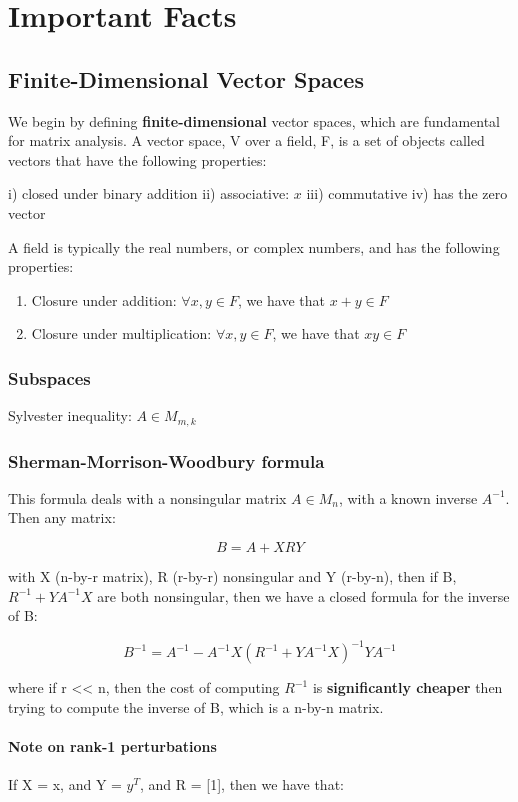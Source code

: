 \documentclass[class=article, crop=false]{standalone}
\begin{document}
\section{Important Facts}
	\subsection{Finite-Dimensional Vector Spaces}
	We begin by defining \textbf{finite-dimensional} vector spaces, which are fundamental for matrix analysis. A vector space, V over a field, F, is a set of objects called vectors that have the following properties:

	i) closed under binary addition
	ii) associative: $x$
	iii) commutative
	iv) has the zero vector

	A field is typically the real numbers, or complex numbers, and has the following properties:

	\begin{enumerate}
		\item Closure under addition: $\forall x, y \in F$, we have that $x+y \in F$
		\item Closure under multiplication: $\forall x, y \in F$, we have that $xy \in F$
	\end{enumerate}

	\subsubsection{Subspaces}

	Sylvester inequality: $A \in M_{m,k}$

	\subsubsection{Sherman-Morrison-Woodbury formula}
		This formula deals with a nonsingular matrix $A \in M_n$, with a known inverse $A^{-1}$. Then any matrix:

			$$B = A + XRY$$

		with X (n-by-r matrix), R (r-by-r) nonsingular and Y (r-by-n), then if B, $R^{-1} + YA^{-1}X$ are both nonsingular, then we have a closed formula for the inverse of B:

			$$B^{-1} = A^{-1} - A^{-1}X(R^{-1} + YA^{-1}X)^{-1} Y A^{-1}$$

		where if r << n, then the cost of computing $R^{-1}$ is \textbf{significantly cheaper} then trying to compute the inverse of B, which is a n-by-n matrix.

		\paragraph{Note on rank-1 perturbations} If X = x, and Y = $y^T$, and R = [1], then we have that:
\end{document}
